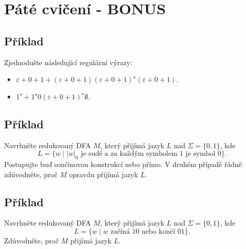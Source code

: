 \section{Páté cvičení - BONUS}

\subsection{Příklad}
Zjednodušte následující regulární výrazy:
\begin{itemize}[a), noitemsep]
    \item $\varepsilon + 0 + 1 + (\varepsilon + 0 + 1)(\varepsilon + 0 + 1)^\star (\varepsilon + 0 + 1)$.
    \item $1^\star + 1^\star 0 (\varepsilon + 0 + 1)^\star \emptyset$.
\end{itemize}


\subsection{Příklad}
Navrhněte redukovaný DFA $M$, který přijímá jazyk $L$ nad $\Sigma = \{0,1\}$, kde
\[L = \{w \mid |w|_0 \text{ je sudé a za každým symbolem } 1 \text{ je symbol } 0\}\text{.}\]
Postupujte buď součinovou konstrukcí nebo přímo. V druhém případě řádně zdůvodněte, proč $M$ opravdu přijímá jazyk $L$.


\subsection{Příklad}
Navrhněte redukovaný DFA $M$, který přijímá jazyk $L$ nad $\Sigma = \{0,1\}$, kde 
\[L = \{w \mid w \text{ začíná } 10 \text{ nebo končí } 01\}\text{.}\]
Zdůvodněte, proč $M$ přijímá jazyk $L$.